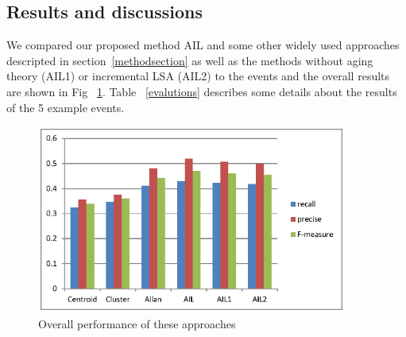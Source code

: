 \documentclass[runningheads,a4paper]{llncs}
\begin{document}
\subsection{Results and discussions}
We compared our proposed method AIL and some other widely used approaches descripted in section~\ref{methodsection} as well as the methods without aging theory (AIL1) or incremental LSA (AIL2) to the events and the overall results are shown in Fig ~\ref{fig:zhuzhuangtu}. Table ~\ref{evalutions} describes some details about the results of the 5 example events.
\begin{figure}
\centering
\includegraphics[height=6.2cm]{zhuzhuangtu}
\caption{Overall performance of these approaches}
\label{fig:zhuzhuangtu}
\end{figure}
\end{document}
